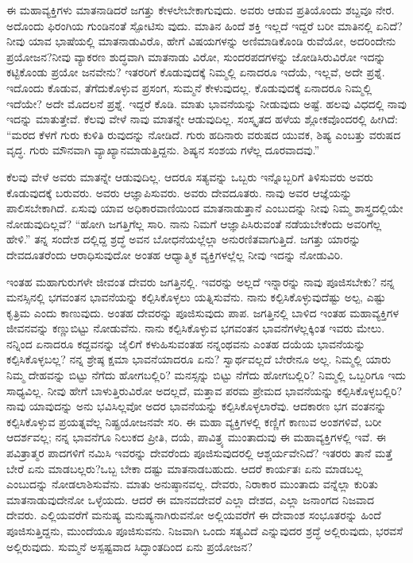 ಈ ಮಹಾವ್ಯಕ್ತಿಗಳು ಮಾತನಾಡಿದರೆ ಜಗತ್ತು ಕೇಳಲೇಬೇಕಾಗುವುದು. ಅವರು ಆಡುವ ಪ್ರತಿಯೊಂದು ಶಬ್ದವೂ ನೇರ. ಅದೊಂದು ಫಿರಂಗಿಯ ಗುಂಡಿನಂತೆ ಸ್ಪೋಟಿಸು ವುದು. ಮಾತಿನ ಹಿಂದೆ ಶಕ್ತಿ ಇಲ್ಲದೆ ಇದ್ದರೆ ಬರೀ ಮಾತಿನಲ್ಲಿ ಏನಿದೆ? ನೀವು ಯಾವ ಭಾಷೆಯಲ್ಲಿ ಮಾತನಾಡುವಿರೊ, ಹೇಗೆ ವಿಷಯಗಳನ್ನು ಅಣಿಮಾಡಿಕೊಂಡಿ ರುವೆಯೋ, ಅದರಿಂದೇನು ಪ್ರಯೋಜನ?ನೀವು ವ್ಯಾಕರಣ ಶುದ್ಧವಾಗಿ ಮಾತನಾಡು ವಿರೋ, ಸುಂದರಪದಗಳನ್ನು ಜೋಡಿಸಿರುವಿರೋ ಇದನ್ನು ಕಟ್ಟಿಕೊಂಡು ಪ್ರಯೋ ಜನವೇನು? ಇತರರಿಗೆ ಕೊಡುವುದಕ್ಕೆ ನಿಮ್ಮಲ್ಲಿ ಏನಾದರೂ ಇದೆಯೆ, ಇಲ್ಲವೆ, ಅದೇ ಪ್ರಶ್ನೆ. ಇದೊಂದು ಕೊಡುವ, ತೆಗೆದುಕೊಳ್ಳುವ ಪ್ರಸಂಗ, ಸುಮ್ಮನೆ ಕೇಳುವುದಲ್ಲ. ಕೊಡುವುದಕ್ಕೆ ಏನಾದರೂ ನಿಮ್ಮಲ್ಲಿ ಇದೆಯೇ? ಅದೇ ಮೊದಲನೆ ಪ್ರಶ್ನೆ. ಇದ್ದರೆ ಕೊಡಿ. ಮಾತು ಭಾವನೆಯನ್ನು ನೀಡುವುದು ಅಷ್ಟೆ. ಹಲವು ವಿಧದಲ್ಲಿ ನಾವು ಇದನ್ನು ಮಾತುತ್ತೇವೆ. ಕೆಲವು ವೇಳೆ ನಾವು ಮಾತನ್ನೇ ಆಡುವುದಿಲ್ಲ. ಸಂಸ್ಕೃತದ ಹಳೆಯ ಶ್ಲೋಕವೊಂದರಲ್ಲಿ ಹೀಗಿದೆ: “ಮರದ ಕೆಳಗೆ ಗುರು ಕುಳಿತಿ ರುವುದನ್ನು ನೋಡಿದೆ. ಗುರು ಹದಿನಾರು ವರುಷದ ಯುವಕ, ಶಿಷ್ಯ ಎಂಬತ್ತು ವರುಷದ ವೃದ್ಧ. ಗುರು ಮೌನವಾಗಿ ವ್ಯಾಖ್ಯಾನಮಾಡುತ್ತಿದ್ದನು. ಶಿಷ್ಯನ ಸಂಶಯ ಗಳೆಲ್ಲ ದೂರವಾದವು.”

ಕೆಲವು ವೇಳೆ ಅವರು ಮಾತನ್ನೇ ಆಡುವುದಿಲ್ಲ. ಆದರೂ ಸತ್ಯವನ್ನು ಒಬ್ಬರು ಇನ್ನೊಬ್ಬರಿಗೆ ತಿಳಿಸುವರು ಅವರು ಕೊಡುವುದಕ್ಕೆ ಬರುವರು. ಅವರು ಆಜ್ಞಾಪಿಸುವರು. ಅವರು ದೇವದೂತರು. ನಾವು ಅವರ ಆಜ್ಞೆಯನ್ನು ಪಾಲಿಸಬೇಕಾಗಿದೆ. ಏಸುವು ಯಾವ ಅಧಿಕಾರವಾಣಿಯಿಂದ ಮಾತನಾಡುತ್ತಾನೆ ಎಂಬುದನ್ನು ನೀವು ನಿಮ್ಮ ಶಾಸ್ತ್ರದಲ್ಲಿಯೇ ನೋಡುವುದಿಲ್ಲವೆ? “ಹೋಗಿ ಜಗತ್ತಿಗೆಲ್ಲ ಸಾರಿ. ನಾನು ನಿಮಗೆ ಆಜ್ಞಾಪಿಸಿರುವಂತೆ ನಡೆಯಬೇಕೆಂದು ಅವರಿಗೆಲ್ಲ ಹೇಳಿ.” ತನ್ನ ಸಂದೇಶ ದಲ್ಲಿದ್ದ ಶ್ರದ್ಧೆ ಅವನ ಬೋಧನೆಯಲ್ಲೆಲ್ಲಾ ಅನುರಣಿತವಾಗುತ್ತಿದೆ. ಜಗತ್ತು ಯಾರನ್ನು ದೇವದೂತರೆಂದು ಆರಾಧಿಸುವುದೋ ಅಂತಹ ಆಧ್ಯಾತ್ಮಿಕ ವ್ಯಕ್ತಿಗಳಲ್ಲೆಲ್ಲ ನೀವು ಇದನ್ನು ನೋಡುವಿರಿ.

ಇಂತಹ ಮಹಾಗುರುಗಳೇ ಜೀವಂತ ದೇವರು ಜಗತ್ತಿನಲ್ಲಿ. ಇವರನ್ನು ಅಲ್ಲದೆ ಇನ್ನಾರನ್ನು ನಾವು ಪೂಜಿಸಬೇಕು? ನನ್ನ ಮನಸ್ಸಿನಲ್ಲಿ ಭಗವಂತನ ಭಾವನೆಯನ್ನು ಕಲ್ಪಿಸಿಕೊಳ್ಳಲು ಯತ್ನಿಸುವೆನು. ನಾನು ಕಲ್ಪಿಸಿಕೊಳ್ಳುವುದೆಷ್ಟು ಅಲ್ಪ, ಎಷ್ಟು ಕೃತ್ರಿಮ ಎಂದು ಕಾಣುವುದು. ಅಂತಹ ದೇವರನ್ನು ಪೂಜಿಸುವುದು ಪಾಪ. ಜಗತ್ತಿನಲ್ಲಿ ಬಾಳಿದ ಇಂತಹ ಮಹಾವ್ಯಕ್ತಿಗಳ ಜೀವನವನ್ನು ಕಣ್ಣುಬಿಟ್ಟು ನೋಡುವೆನು. ನಾನು ಕಲ್ಪಿಸಿಕೊಳ್ಳುವ ಭಗವಂತನ ಭಾವನೆಗಳೆಲ್ಲಕ್ಕಿಂತ ಇವರು ಮೇಲು. ನನ್ನಿಂದ ಏನಾದರೂ ಕದ್ದವನನ್ನು ಜೈಲಿಗೆ ಕಳುಹಿಸುವಂತಹ ನನ್ನಂಥವನು ಎಂತಹ ದಯೆಯ ಭಾವನೆಯನ್ನು ಕಲ್ಪಿಸಿಕೊಳ್ಳಬಲ್ಲ? ನನ್ನ ಶ್ರೇಷ್ಠ ಕ್ಷಮಾ ಭಾವನೆಯಾದರೂ ಏನು? ಸ್ವಾರ್ಥವಲ್ಲದೆ ಬೇರೇನೂ ಅಲ್ಲ. ನಿಮ್ಮಲ್ಲಿ ಯಾರು ನಿಮ್ಮ ದೇಹವನ್ನು ಬಿಟ್ಟು ನೆಗೆದು ಹೋಗಬಲ್ಲಿರಿ? ಮನಸ್ಸನ್ನು ಬಿಟ್ಟು ನೆಗೆದು ಹೋಗಬಲ್ಲಿರಿ? ನಿಮ್ಮಲ್ಲಿ ಒಬ್ಬರಿಗೂ ಇದು ಸಾಧ್ಯವಿಲ್ಲ. ನೀವು ಹೇಗೆ ಬಾಳುತ್ತಿರುವಿರೋ ಅದಲ್ಲದೆ, ಮತ್ತಾವ ಪರಮ ಪ್ರೇಮದ ಭಾವನೆಯನ್ನು ಕಲ್ಪಿಸಿಕೊಳ್ಳಬಲ್ಲಿರಿ? ನಾವು ಯಾವುದನ್ನು ಅನು ಭವಿಸಿಲ್ಲವೋ ಅದರ ಭಾವನೆಯನ್ನು ಕಲ್ಪಿಸಿಕೊಳ್ಳಲಾರೆವು. ಆದಕಾರಣ ಭಗ ವಂತನನ್ನು ಕಲ್ಪಿಸಿಕೊಳ್ಳುವ ಪ್ರಯತ್ನವೆಲ್ಲ ನಿಷ್ಪ್ರಯೋಜನವೇ ಸರಿ. ಈ ಮಹಾ ವ್ಯಕ್ತಿಗಳಲ್ಲಿ ಕಣ್ಣಿಗೆ ಕಾಣುವ ಅಂಶಗಳಿವೆ, ಬರೀ ಆದರ್ಶವಲ್ಲ; ನನ್ನ ಭಾವನೆಗೂ ನಿಲುಕದ ಪ್ರೀತಿ, ದಯೆ, ಪಾವಿತ್ರ್ಯ ಮುಂತಾದುವು ಈ ಮಹಾವ್ಯಕ್ತಿಗಳಲ್ಲಿ ಇವೆ. ಈ ಪವಿತ್ರಾತ್ಮರ ಪಾದಗಳಿಗೆ ನಮಿಸಿ ಇವರನ್ನು ದೇವರೆಂದು ಪೂಜಿಸುವುದರಲ್ಲಿ ಆಶ್ಚರ್ಯವೇನಿದೆ? ಇತರರು ತಾನೆ ಮತ್ತೆ ಬೇರೆ ಏನು ಮಾಡಬಲ್ಲರು?ಒಬ್ಬ ಬೇಕಾ ದಷ್ಟು ಮಾತನಾಡಬಹುದು. ಆದರೆ ಕಾರ್ಯತಃ ಏನು ಮಾಡಬಲ್ಲ ಎಂಬುದನ್ನು ನೋಡಲಾಶಿಸುವೆನು. ಮಾತು ಅನುಷ್ಠಾನವಲ್ಲ. ದೇವರು, ನಿರಾಕಾರ ಮುಂತಾದು ವನ್ನೆಲ್ಲಾ ಕುರಿತು ಮಾತನಾಡುವುದೇನೋ ಒಳ್ಳೆಯದು. ಆದರೆ ಈ ಮಾನವದೇವರೆ ಎಲ್ಲಾ ದೇಶದ, ಎಲ್ಲಾ ಜನಾಂಗದ ನಿಜವಾದ ದೇವರು. ಎಲ್ಲಿಯವರೆಗೆ ಮನುಷ್ಯ ಮನುಷ್ಯನಾಗಿರುವನೋ ಅಲ್ಲಿಯವರೆಗೆ ಈ ದೇವಾಂಶ ಸಂಭೂತರನ್ನು ಹಿಂದೆ ಪೂಜಿಸುತ್ತಿದ್ದನು, ಮುಂದೆಯೂ ಪೂಜಿಸುವನು. ನಿಜವಾಗಿ ಒಂದು ಸತ್ಯವಿದೆ ಎನ್ನುವುದರ ಶ್ರದ್ಧೆ ಅಲ್ಲಿರುವುದು, ಭರವಸೆ ಅಲ್ಲಿರುವುದು. ಸುಮ್ಮನೆ ಅಸ್ಪಷ್ಟವಾದ ಸಿದ್ಧಾಂತದಿಂದ ಏನು ಪ್ರಯೋಜನ?

